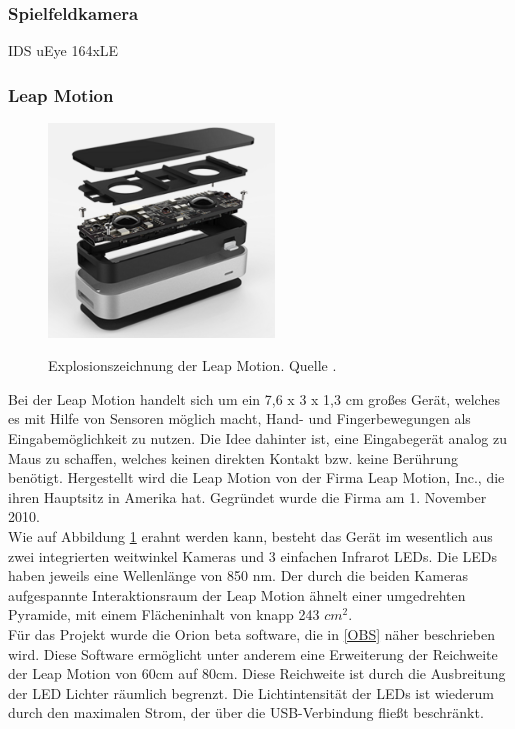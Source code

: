 \subsubsection{Spielfeldkamera} 
IDS uEye 164xLE

\subsubsection{Leap Motion} 

\begin{figure}[H]
		\center 
		\includegraphics[width=6cm]{Bilder/leap-motion.png}
			\label{fig:leapMotion}
			\caption{Explosionszeichnung der Leap Motion. Quelle \cite{website:LeapMotionBlog}.}
	\end{figure}
	
Bei der Leap Motion \cite{website:LeapMotion} handelt sich um ein 7,6 x 3 x 1,3 cm großes Gerät, welches es mit Hilfe von Sensoren möglich macht, Hand- und Fingerbewegungen als Eingabemöglichkeit zu nutzen. Die Idee dahinter ist, eine Eingabegerät analog zu Maus zu schaffen, welches keinen direkten Kontakt bzw. keine Berührung benötigt. Hergestellt wird die Leap Motion von der Firma Leap Motion, Inc., die ihren Hauptsitz in Amerika hat. Gegründet wurde die Firma am 1. November 2010. \\
Wie auf Abbildung \ref{fig:leapMotion} erahnt werden kann, besteht das Gerät im wesentlich aus zwei integrierten weitwinkel Kameras und 3 einfachen Infrarot LEDs. Die LEDs haben jeweils eine Wellenlänge von 850 nm. Der durch die beiden Kameras aufgespannte Interaktionsraum der Leap Motion ähnelt einer umgedrehten Pyramide, mit einem Flächeninhalt von knapp 243 $cm{^2}$. \\
Für das Projekt wurde die Orion beta software, die in \ref{OBS} näher beschrieben wird. Diese Software ermöglicht unter anderem eine Erweiterung der Reichweite der Leap Motion von 60cm auf 80cm. Diese Reichweite ist durch die Ausbreitung der LED Lichter räumlich begrenzt. Die Lichtintensität der LEDs ist wiederum durch den maximalen Strom, der über die USB-Verbindung fließt beschränkt. \\


